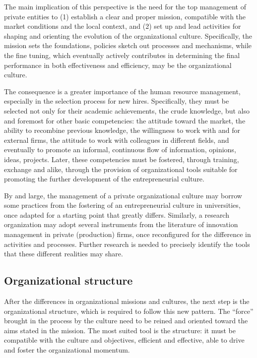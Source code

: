 The main implication of this perspective is the need for the top management of private entities to (1) establish a clear and proper mission, compatible with the market conditions and the local context, and (2) set up and lead activities for shaping and orienting the evolution of the organizational culture. Specifically, the mission sets the foundations, policies sketch out processes and mechanisms, while the fine tuning, which eventually actively contributes in determining the final performance in both effectiveness and efficiency, may be the organizational culture.

The consequence is a greater importance of the human resource management, especially in the selection process for new hires. Specifically, they must be selected not only for their academic achievements, the crude knowledge, but also and foremost for other basic competencies: the attitude toward the market, the ability to recombine previous knowledge, the willingness to work with and for external firms, the attitude to work with colleagues in different fields, and eventually to promote an informal, continuous flow of information, opinions, ideas, projects. Later, these competencies must be fostered, through training, exchange and alike, through the provision of organizational tools suitable for promoting the further development of the entrepreneurial culture. 

By and large, the management of a private organizational culture may borrow some practices from the fostering of an entrepreneurial culture in universities, once adapted for a starting point that greatly differs. Similarly, a research organization may adopt several instruments from the literature of innovation management in private (production) firms, once reconfigured for the difference in activities and processes. Further research is needed to precisely identify the tools that these different realities may share.

\subsection{Organizational structure}

After the differences in organizational missions and cultures, the next step is the organizational structure, which is required to follow this new pattern. The \enquote{force} brought in the process by the culture need to be reined and oriented toward the aims stated in the mission. The most suited tool is the structure: it must be compatible with the culture and objectives, efficient and effective, able to drive and foster the organizational momentum. 

